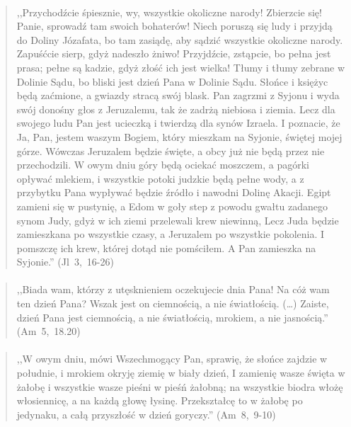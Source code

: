 \documentclass[10pt,a4paper,oneside]{article}
\begin{document}
\paragraph{}
\begin{quote}
,,Przychodźcie śpiesznie, wy, wszystkie okoliczne narody! Zbierzcie się! Panie, sprowadź tam swoich bohaterów! Niech poruszą się ludy i przyjdą do Doliny Józafata, bo tam zasiądę, aby sądzić wszystkie okoliczne narody. Zapuśćcie sierp, gdyż nadeszło żniwo! Przyjdźcie, zstąpcie, bo pełna jest prasa; pełne są kadzie, gdyż złość ich jest wielka! Tłumy i tłumy zebrane w Dolinie Sądu, bo bliski jest dzień Pana w Dolinie Sądu. Słońce i księżyc będą zaćmione, a gwiazdy stracą swój blask. Pan zagrzmi z Syjonu i wyda swój donośny głos z Jeruzalemu, tak że zadrżą niebiosa i ziemia. Lecz dla swojego ludu Pan jest ucieczką i twierdzą dla synów Izraela. I poznacie, że Ja, Pan, jestem waszym Bogiem, który mieszkam na Syjonie, świętej mojej górze. Wówczas Jeruzalem będzie święte, a obcy już nie będą przez nie przechodzili. W owym dniu góry będą ociekać moszczem, a pagórki opływać mlekiem, i wszystkie potoki judzkie będą pełne wody, a z przybytku Pana wypływać będzie źródło i nawodni Dolinę Akacji. Egipt zamieni się w pustynię, a Edom w goły step z powodu gwałtu zadanego synom Judy, gdyż w ich ziemi przelewali krew niewinną, Lecz Juda będzie zamieszkana po wszystkie czasy, a Jeruzalem po wszystkie pokolenia. I pomszczę ich krew, której dotąd nie pomściłem. A Pan zamieszka na Syjonie.'' \mbox{(Jl 3, 16-26)}
\end{quote}
\paragraph{}
\begin{quote}
,,Biada wam, którzy z utęsknieniem oczekujecie dnia Pana! Na cóż wam ten dzień Pana? Wszak jest on ciemnością, a nie światłością. (\ldots) Zaiste, dzień Pana jest ciemnością, a nie światłością, mrokiem, a nie jasnością.'' \mbox{(Am 5, 18.20)}
\end{quote}
\paragraph{}
\begin{quote}
,,W owym dniu, mówi Wszechmogący Pan, sprawię, że słońce zajdzie w południe, i mrokiem okryję ziemię w biały dzień, I zamienię wasze święta w żałobę i wszystkie wasze pieśni w pieśń żałobną; na wszystkie biodra włożę włosiennicę, a na każdą głowę łysinę. Przekształcę to w żałobę po jedynaku, a całą przyszłość w dzień goryczy.'' \mbox{(Am 8, 9-10)}
\end{quote}
\end{document}
